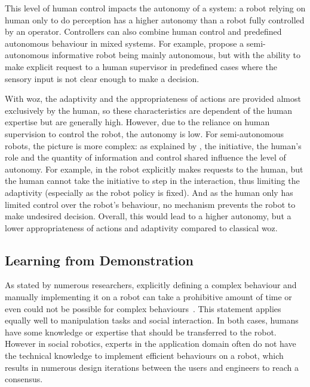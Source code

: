 	This level of human control impacts the autonomy of a system: a robot relying on human only to do perception has a higher autonomy than a robot fully controlled by an operator. Controllers can also combine human control and predefined autonomous behaviour in mixed systems. For example, \citet{shiomi2008semi} propose a semi-autonomous informative robot being mainly autonomous, but with the ability to make explicit request to a human supervisor in predefined cases where the sensory input is not clear enough to make a decision. %
	
	With \gls{woz}, the adaptivity and the appropriateness of actions are provided almost exclusively by the human, so these characteristics are dependent of the human expertise but are generally high. However, due to the reliance on human supervision to control the robot, the autonomy is low. For semi-autonomous robots, the picture is more complex: as explained by \cite{beer2014toward}, the initiative, the human's role and the quantity of information and control shared influence the level of autonomy. For example, in \citet{shiomi2008semi} the robot explicitly makes requests to the human, but the human cannot take the initiative to step in the interaction, thus limiting the adaptivity (especially as the robot policy is fixed). And as the human only has limited control over the robot's behaviour, no mechanism prevents the robot to make undesired decision. Overall, this would lead to a higher autonomy, but a lower appropriateness of actions and adaptivity compared to classical \gls{woz}.

\subsection{Learning from Demonstration} \label{ssec:back_lfd}
	As stated by numerous researchers, explicitly defining a complex behaviour and manually implementing it on a robot can take a prohibitive amount of time or even could not be possible for complex behaviours~\citep{argall2009survey,billard2008robot,dautenhahn2004robots}. This statement applies equally well to manipulation tasks and social interaction. In both cases, humans have some knowledge or expertise that should be transferred to the robot. However in social robotics, experts in the application domain often do not have the technical knowledge to implement efficient behaviours on a robot, which results in numerous design iterations between the users and engineers to reach a consensus. 
	
